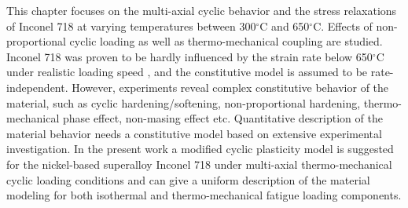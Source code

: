 
\noindent
This chapter focuses on the multi-axial cyclic behavior and the stress relaxations of Inconel 718 at varying temperatures between 300$^\circ$C and 650$^\circ$C. Effects of non-proportional cyclic loading as well as thermo-mechanical coupling are studied. Inconel 718 was proven to be hardly influenced by the strain rate below 650$^\circ$C under realistic loading speed \cite{kim1988elevated, Schlesinger2017}, and the constitutive model is assumed to be rate-independent. However, experiments reveal complex constitutive behavior of the material, such as cyclic hardening/softening, non-proportional hardening, thermo-mechanical phase effect, non-masing effect etc. Quantitative description of the material behavior needs a constitutive model based on extensive experimental investigation. In the present work a modified cyclic plasticity model is suggested for the nickel-based superalloy Inconel 718 under multi-axial thermo-mechanical cyclic loading conditions and can give a uniform description of the material modeling for both isothermal and thermo-mechanical fatigue loading components.

